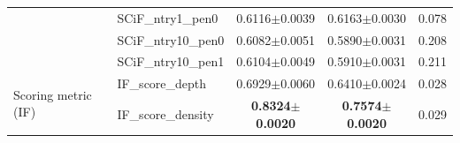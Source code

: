 \begin{table}[t]
\begin{tabular}{llccc}
& SCiF\_ntry1\_pen0  & 0.6116$\pm$0.0039 & 0.6163$\pm$0.0030 & 0.078 \\
& SCiF\_ntry10\_pen0 & 0.6082$\pm$0.0051 & 0.5890$\pm$0.0031 & 0.208 \\
& SCiF\_ntry10\_pen1 & 0.6104$\pm$0.0049 & 0.5910$\pm$0.0031 & 0.211 \\
\midrule
\multirow{2}{*}{Scoring metric (IF)}
& IF\_score\_depth   & 0.6929$\pm$0.0060 & 0.6410$\pm$0.0024 & 0.028 \\
& IF\_score\_density & \textbf{0.8324$\pm$0.0020} & \textbf{0.7574$\pm$0.0020} & 0.029 \\
\bottomrule
\end{tabular}
\end{table}

